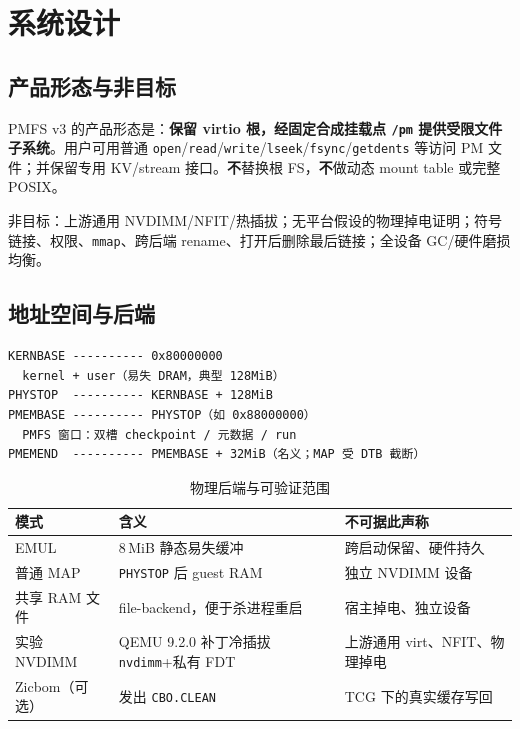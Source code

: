\chapter{系统设计}
\label{chap:design}

\section{产品形态与非目标}

PMFS v3 的产品形态是：\textbf{保留 virtio 根，经固定合成挂载点 \texttt{/pm} 提供受限文件子系统}。用户可用普通 \texttt{open}/\texttt{read}/\texttt{write}/\texttt{lseek}/\texttt{fsync}/\texttt{getdents} 等访问 PM 文件；并保留专用 KV/stream 接口。\textbf{不}替换根 FS，\textbf{不}做动态 mount table 或完整 POSIX。

非目标：上游通用 NVDIMM/NFIT/热插拔；无平台假设的物理掉电证明；符号链接、权限、\texttt{mmap}、跨后端 rename、打开后删除最后链接；全设备 GC/硬件磨损均衡。

\section{地址空间与后端}

\begin{lstlisting}[caption={地址布局示意（MAP / 实验 NVDIMM）},label={lst:layout}]
KERNBASE ---------- 0x80000000
  kernel + user（易失 DRAM，典型 128MiB）
PHYSTOP  ---------- KERNBASE + 128MiB
PMEMBASE ---------- PHYSTOP（如 0x88000000）
  PMFS 窗口：双槽 checkpoint / 元数据 / run
PMEMEND  ---------- PMEMBASE + 32MiB（名义；MAP 受 DTB 截断）
\end{lstlisting}

\begin{table}[htbp]
  \centering
  \caption{物理后端与可验证范围}
  \label{tab:backends}
  \begin{tabular}{p{2.2cm}p{5.0cm}p{5.2cm}}
    \toprule
    模式 & 含义 & 不可据此声称 \\
    \midrule
    EMUL & 8\,MiB 静态易失缓冲 & 跨启动保留、硬件持久 \\
    普通 MAP & \texttt{PHYSTOP} 后 guest RAM & 独立 NVDIMM 设备 \\
    共享 RAM 文件 & file-backend，便于杀进程重启 & 宿主掉电、独立设备 \\
    实验 NVDIMM & QEMU 9.2.0 补丁冷插拔 \texttt{nvdimm}+私有 FDT
      & 上游通用 virt、NFIT、物理掉电 \\
    Zicbom（可选） & 发出 \texttt{CBO.CLEAN} & TCG 下的真实缓存写回 \\
    \bottomrule
  \end{tabular}
\end{table}


